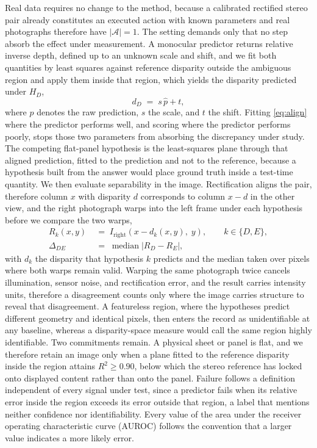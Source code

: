 \documentclass{article} %
\theoremstyle{defstyle}
\theoremstyle{plain}
\begin{document}
Real data requires no change to the method, because a calibrated rectified stereo pair
already constitutes an executed action with known parameters and real photographs therefore
have $|\mathcal{A}| = 1$. The setting demands only that no step absorb the effect under
measurement. A monocular predictor returns relative inverse depth, defined up to an unknown
scale and shift, and we fit both quantities by least squares against reference disparity
outside the ambiguous region and apply them inside that region, which yields the disparity
predicted under $H_D$,
\begin{equation}
\label{eq:align}
d_{D} \;=\; s\,\hat{p} + t ,
\end{equation}
where $\hat{p}$ denotes the raw prediction, $s$ the scale, and $t$ the shift. Fitting
\eqref{eq:align} where the predictor performs well, and scoring where the predictor
performs poorly, stops those two parameters from absorbing the discrepancy under study. The
competing flat-panel hypothesis is the least-squares plane through that aligned prediction,
fitted to the prediction and not to the reference, because a hypothesis built from the
answer would place ground truth inside a test-time quantity. We then evaluate separability
in the image. Rectification aligns the pair, therefore column $x$ with disparity $d$
corresponds to column $x - d$ in the other view, and the right photograph warps into the
left frame under each hypothesis before we compare the two warps,
\begin{align}
\label{eq:warp}
R_{k}(x, y) \;&=\; I_{\text{right}}\!\left(x - d_{k}(x,y),\; y\right),
\qquad k \in \{D, E\}, \\
\label{eq:delta-photometric}
\Delta_{DE} \;&=\; \operatorname{median}\left|R_{D} - R_{E}\right| ,
\end{align}
with $d_k$ the disparity that hypothesis $k$ predicts and the median taken over pixels where
both warps remain valid. Warping the same photograph twice cancels illumination, sensor
noise, and rectification error, and the result carries intensity units, therefore a
disagreement counts only where the image carries structure to reveal that disagreement. A
featureless region, where the hypotheses predict different geometry and identical pixels,
then enters the record as unidentifiable at any baseline, whereas a disparity-space measure
would call the same region highly identifiable. Two commitments remain. A physical sheet or
panel is flat, and we therefore retain an image only when a plane fitted to the reference
disparity inside the region attains $R^2 \geq 0.90$, below which the stereo reference has
locked onto displayed content rather than onto the panel. Failure follows a definition
independent of every signal under test, since a predictor fails when its relative error
inside the region exceeds its error outside that region, a label that mentions neither
confidence nor identifiability. Every value of the area under the receiver operating
characteristic curve (AUROC) follows the convention that a larger value indicates a more
likely error.
\end{document}
